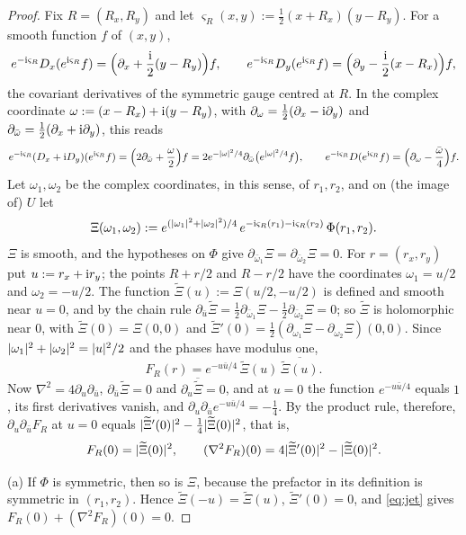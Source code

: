 \begin{proof}
Fix $R=(R_x,R_y)$ and let $\varsigma_R(x,y):=\frac12(x+R_x)(y-R_y)$. For a smooth function $f$ of $(x,y)$,
\[
e^{-\mathrm{i}\varsigma_R}D_x(e^{\mathrm{i}\varsigma_R}f)=\Bigl(\partial_x+\frac{\mathrm{i}}2(y-R_y)\Bigr)f,\qquad
e^{-\mathrm{i}\varsigma_R}D_y(e^{\mathrm{i}\varsigma_R}f)=\Bigl(\partial_y-\frac{\mathrm{i}}2(x-R_x)\Bigr)f,
\]
the covariant derivatives of the symmetric gauge centred at $R$. In the complex coordinate
$\omega:=(x-R_x)+\mathrm{i}(y-R_y)$, with $\partial_\omega=\frac12(\partial_x-\mathrm{i}\partial_y)$ and $\partial_{\bar\omega}=\frac12(\partial_x+\mathrm{i}\partial_y)$,
this reads
\[
e^{-\mathrm{i}\varsigma_R}(D_x+\mathrm{i} D_y)(e^{\mathrm{i}\varsigma_R}f)=\Bigl(2\partial_{\bar\omega}+\frac\omega2\Bigr)f=2e^{-\lvert\omega\rvert^2/4}\partial_{\bar\omega}\bigl(e^{\lvert\omega\rvert^2/4}f\bigr),\qquad
e^{-\mathrm{i}\varsigma_R}D(e^{\mathrm{i}\varsigma_R}f)=\Bigl(\partial_\omega-\frac{\bar\omega}4\Bigr)f .
\]
Let $\omega_1,\omega_2$ be the complex coordinates, in this sense, of $r_1,r_2$, and on (the image of) $U$ let
\[
\Xi(\omega_1,\omega_2):=e^{(\lvert\omega_1\rvert^2+\lvert\omega_2\rvert^2)/4}\,e^{-\mathrm{i}\varsigma_R(r_1)-\mathrm{i}\varsigma_R(r_2)}\,\Phi(r_1,r_2).
\]
$\Xi$ is smooth, and the hypotheses on $\Phi$ give $\partial_{\bar\omega_1}\Xi=\partial_{\bar\omega_2}\Xi=0$. For $r=(r_x,r_y)$ put
$u:=r_x+\mathrm{i} r_y$; the points $R+r/2$ and $R-r/2$ have the coordinates $\omega_1=u/2$ and $\omega_2=-u/2$. The function
$\widetilde\Xi(u):=\Xi(u/2,-u/2)$ is defined and smooth near $u=0$, and by the chain rule
$\partial_{\bar u}\widetilde\Xi=\frac12\partial_{\bar\omega_1}\Xi-\frac12\partial_{\bar\omega_2}\Xi=0$; so $\widetilde\Xi$ is holomorphic
near $0$, with $\widetilde\Xi(0)=\Xi(0,0)$ and $\widetilde\Xi'(0)=\frac12(\partial_{\omega_1}\Xi-\partial_{\omega_2}\Xi)(0,0)$. Since
$\lvert\omega_1\rvert^2+\lvert\omega_2\rvert^2=\lvert u\rvert^2/2$ and the phases have modulus one,
\[
F_R(r)=e^{-u\bar u/4}\,\widetilde\Xi(u)\,\overline{\widetilde\Xi(u)} .
\]
Now $\nabla^2=4\partial_u\partial_{\bar u}$, $\partial_{\bar u}\widetilde\Xi=0$ and $\partial_u\overline{\widetilde\Xi}=0$, and at $u=0$ the
function $e^{-u\bar u/4}$ equals $1$, its first derivatives vanish, and $\partial_u\partial_{\bar u}e^{-u\bar u/4}=-\frac14$. By the
product rule, therefore, $\partial_u\partial_{\bar u}F_R$ at $u=0$ equals $\lvert\widetilde\Xi'(0)\rvert^2-\frac14\lvert\widetilde\Xi(0)\rvert^2$, that
is,
\begin{equation}\label{eq:jet}
F_R(0)=\lvert\widetilde\Xi(0)\rvert^2,\qquad(\nabla^2F_R)(0)=4\lvert\widetilde\Xi'(0)\rvert^2-\lvert\widetilde\Xi(0)\rvert^2 .
\end{equation}

(a) If $\Phi$ is symmetric, then so is $\Xi$, because the prefactor in its definition is symmetric in $(r_1,r_2)$.
Hence $\widetilde\Xi(-u)=\widetilde\Xi(u)$, $\widetilde\Xi'(0)=0$, and \eqref{eq:jet} gives $F_R(0)+(\nabla^2F_R)(0)=0$.


\end{proof}

